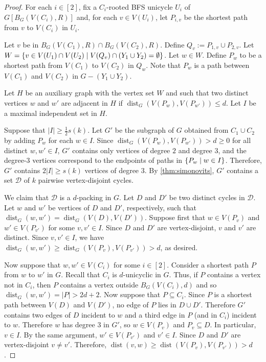 \documentclass{patmorin}
\newcommand{\pat}[1]{\textcolor{Blue}{Pat: #1}}
\DeclareMathOperator{\dist}{dist}
\DeclarePairedDelimiter\set{\{}{\}}
\begin{document}
\begin{proof}
    For each $i\in[2]$, fix a $C_i$-rooted BFS unicycle $U_i$ of $G[B_G(V(C_i),R)]$ and, for each $v\in V(U_i)$, let $P_{i,v}$ be the shortest path from $v$ to $V(C_i)$ in $U_i$. 
    
    Let $v$ be in $B_G(V(C_1),R)\cap B_G(V(C_2),R)$.
    Define $Q_v:= P_{1,v}\cup P_{2,v}$.
    Let $W=\set{v \in V(U_1)\cap V(U_2) \mid V(Q_v)\cap (Y_1\cup Y_2) =\emptyset}$.
    Let $w \in W$.
    Define $P_w$ to be a shortest path from $V(C_1)$ to $V(C_2)$ in $Q_w$.
    Note that $P_w$ is a path between $V(C_1)$ and $V(C_2)$ in $G-(Y_1\cup Y_2)$.


    Let $H$ be an auxiliary graph with the vertex set $W$ and such that two distinct vertices $w$ and $w'$ are adjacent in $H$ if $\dist_G(V(P_w),V(P_{w'}))\leq d$.
    Let $I$ be a maximal independent set in $H$.

    Suppose that $|I|\geq \frac{1}{2}s(k)$.
    Let $G'$ be the subgraph of $G$ obtained from $C_1\cup C_2$ by adding $P_w$ for each $w\in I$.
    Since $\dist_G(V(P_w),V(P_{w'}))>d\ge0$ for all distinct $w,w'\in I$, $G'$ contains only vertices of degree $2$ and degree $3$, and the degree-$3$ vertices correspond to the endpoints of paths in $\set{P_w\mid w\in I}$.
    Therefore, $G'$ contains $2|I|\geq s(k)$ vertices of degree $3$.
    By \cref{thm:simonovits}, $G'$ contains a set $\mathcal{D}$ of $k$ pairwise vertex-disjoint cycles.

    We claim that $\mathcal{D}$ is a $d$-packing in $G$.
    Let $D$ and $D'$ be two distinct cycles in $\mathcal{D}$.
    Let $w$ and $w'$ be vertices of $D$ and $D'$, respectively,
    such that $\dist_G(w,w')=\dist_G(V(D),V(D'))$.
    Suppose first that $w\in V(P_v)$ and $w'\in V(P_{v'})$ for some  $v,v' \in I$.
    Since $D$ and $D'$ are vertex-disjoint, $v$ and $v'$ are distinct.
    Since $v,v'\in I$, we have $\dist_G(w,w') \geq \dist_G(V(P_v),V(P_{v'}))>d$, as desired.

    Now suppose that $w, w' \in V(C_i)$ for some $i\in[2]$.
    Consider a shortest path $P$ from $w$ to $w'$ in $G$.
    Recall that $C_i$ is $d$-unicyclic in $G$.
    Thus, if $P$ contains a vertex not in $C_i$, then $P$ contains a vertex outside $B_G(V(C_i),d)$ and so $\dist_G(w,w')=|P|>2d+2$.
    Now suppose that $P\subseteq C_i$.
    Since $P$ is a shortest path between $V(D)$ and $V(D')$, no edge of $P$ lies in $D\cup D'$.
    Therefore $G'$ contains two edges of $D$ incident to $w$ and a third edge in $P$ (and in $C_i$) incident to $w$.
    Therefore $w$ has degree $3$ in $G'$, so $w\in V(P_{v})$ and $P_v\subseteq D$.
    In particular, $v\in I$.
    By the same argument, $w'\in V(P_{v'})$ and $v'\in I$.
    Since $D$ and $D'$ are vertex-disjoint $v\neq v'$.
    Therefore, $\dist(v,w)\ge \dist(V(P_v),V(P_{v'}))>d$.



\end{proof}
\end{document}
